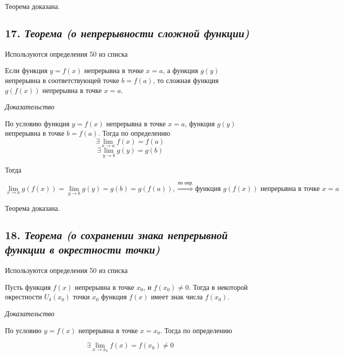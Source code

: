Теорема доказана.
\newpage 
\subsection*{17. \textit{Теорема (о непрерывности сложной функции)}}
\begin{Quote2} 
\small\centering 

Используются определения 50 из списка \end{Quote2} 

Если функция $y = f(x)$ непрерывна в точке $x = a$, а функция $g(y)$ непрерывна в соответствующей точке $b = f(a)$, то сложная функция $g(f(x))$ непрерывна в точке $x = a$.
\vspace*{20pt} 

\textit{Доказательство}

По условию функция $y = f(x)$ непрерывна в точке $x = a$, функция $g(y)$ непрерывна в точке $b = f(a)$. Тогда по определению $$\exists\lim\limits_{x \to a}f(x) = f(a)$$ $$\exists\lim\limits_{y \to b}g(y) = g(b)$$

Тогда

$$
\lim\limits_{x \to a}g(f(x)) = \lim\limits_{y \to b}g(y) = g(b) = g(f(a)), \overset{\text{по опр.}}\Rightarrow \text{функция } g(f(x)) \text{ непрерывна в точке } x = a
$$

Теорема доказана.
\newpage 
\subsection*{18. \textit{Теорема (о сохранении знака непрерывной функции в окрестности точки)}}
\begin{Quote2} 
\small\centering 

Используются определения 50 из списка \end{Quote2} 

Пусть функция $f(x)$ непрерывна в точке $x_0$, и $f(x_0) \neq 0$. Тогда в некоторой окрестности $U_\delta(x_0)$ точки $x_0$ функция $f(x)$ имеет знак числа $f(x_0)$.
\vspace*{20pt} 

\textit{Доказательство}

По условию $y = f(x)$ непрерывна в точке $x = x_0$. Тогда по определению

$$
\exists\lim\limits_{x \to x_0}f(x) = f(x_0) \neq 0
$$

